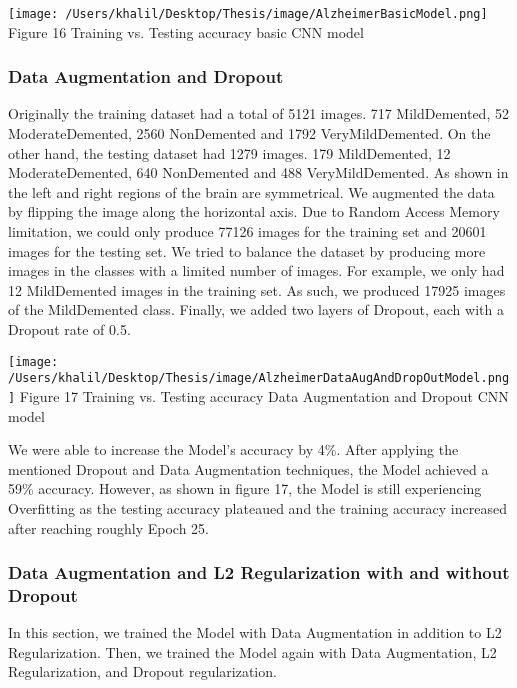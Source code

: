 \documentclass[oneside,12pt,article]{article}
\begin{document}
 \begin{center}
\texttt{[image: /Users/khalil/Desktop/Thesis/image/AlzheimerBasicModel.png]} 
\newline
Figure 16 Training vs. Testing accuracy basic CNN model 
\end{center}



\subsubsection{Data Augmentation and Dropout}
Originally the training dataset had a total of 5121 images. 717 MildDemented, 52 ModerateDemented, 2560 NonDemented and 1792 VeryMildDemented. On the other hand, the testing dataset had 1279 images. 179 MildDemented, 12 ModerateDemented, 640 NonDemented and 488 VeryMildDemented. As shown in \cite{8261460} the left and right regions of the brain are symmetrical. We augmented the data by flipping the image along the horizontal axis. Due to Random Access Memory limitation, we could only produce 77126 images for the training set and 20601 images for the testing set. We tried to balance the dataset by producing more images in the classes with a limited number of images. For example, we only had 12 MildDemented images in the training set. As such, we produced 17925 images of the MildDemented class. Finally, we added two layers of Dropout, each with a Dropout rate of 0.5. 


 \begin{center}
\texttt{[image: /Users/khalil/Desktop/Thesis/image/AlzheimerDataAugAndDropOutModel.png]} 
\newline
Figure 17 Training vs. Testing accuracy Data Augmentation and Dropout CNN model 
\end{center}
We were able to increase the Model's accuracy by 4\%. After applying the mentioned Dropout and Data Augmentation techniques, the Model achieved a 59\% accuracy. However, as shown in figure 17, the Model is still experiencing Overfitting as the testing accuracy plateaued and the training accuracy increased after reaching roughly Epoch 25.  

\subsubsection{Data Augmentation and L2 Regularization with and without Dropout }
In this section, we trained the Model with Data Augmentation in addition to L2 Regularization. Then, we trained the Model again with Data Augmentation, L2 Regularization, and Dropout regularization.  
\end{document}
